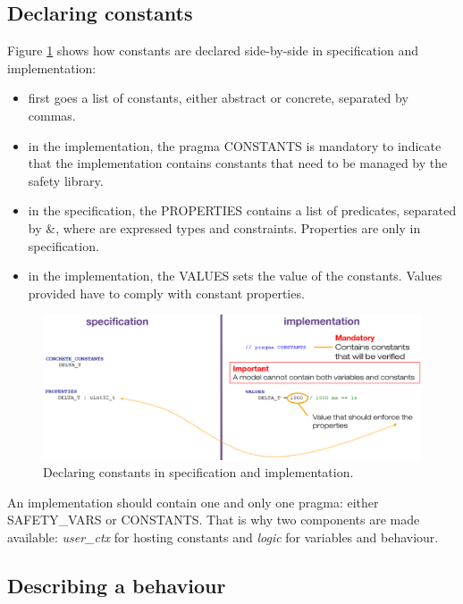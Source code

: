 \subsection{Declaring constants}

Figure \ref{programming:constant-decl} shows how constants are declared side-by-side in specification and implementation:
\begin{itemize}
    \item first goes a list of constants, either abstract or concrete, separated by commas.
    \item in the implementation, the pragma CONSTANTS is mandatory to indicate that the implementation contains constants that need to be managed by the safety library.
    \item in the specification, the PROPERTIES contains a list of predicates, separated by \&, where are expressed types and constraints. Properties are only in specification.
    \item in the implementation, the VALUES sets the value of the constants. Values provided have to comply with constant properties.
\end{itemize}
\begin{figure}[ht]
\centering\includegraphics[scale=0.25]{Pictures/chapterProgramming/constants-decl.png}
\caption{Declaring constants in specification and implementation. }
\label{programming:constant-decl}
\end{figure}  

\begin{remark}
An implementation should contain one and only one pragma: either SAFETY\_VARS or CONSTANTS. That is why two components are made available: \textit{user\_ctx} for hosting constants and \textit{logic} for variables and behaviour.
\end{remark}

\subsection{Describing a behaviour}

